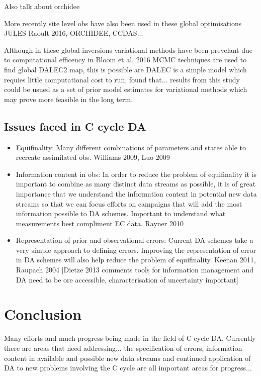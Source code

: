 \documentclass[12pt]{article}
\begin{document}
Also talk about orchidee

More recently site level obs have also been used in these global optimisations JULES Raoult 2016, ORCHIDEE, CCDAS...

Although in these global inversions variational methods have been prevelant due to computational efficency in Bloom et al. 2016 MCMC techniques are used to find global DALEC2 map, this is possible are DALEC is a simple model which requies little computational cost to run, found that... results from this study could be usued as a set of prior model estimates for variational methods which may prove more feasible in the long term.

 

\subsection{Issues faced in C cycle DA}

\begin{itemize}
\item Equifinality: Many different combinations of parameters and states able to recreate assimilated obs. Williams 2009, Luo 2009

\item Information content in obs: In order to reduce the problem of equifinality it is important to combine as many distinct data streams as possible, it is of great importance that we understand the information content in potential new data streams so that we can focus efforts on campaigns that will add the most information possible to DA schemes. Important to understand what measurements best compliment EC data. Rayner 2010

\item Representation of prior and observational errors: Current DA schemes take a very simple approach to defining errors. Improving the representation of error in DA schemes will also help reduce the problem of equifinality. Keenan 2011, Raupach 2004  
[Dietze 2013 comments tools for information management and DA need to be ore accessible, characterisation of uncertainty important]
\end{itemize}

\section{Conclusion} 

Many efforts and much progress being made in the field of C cycle DA. Currently there are areas that need addressing... the specification of errors, information content in available and possible new data streams and continued application of DA to new problems involving the C cycle are all important areas for progress...
\end{document}
